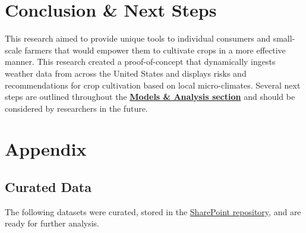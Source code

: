 \documentclass{article}
\begin{document}
\section{Conclusion \& Next Steps}
This research aimed to provide unique tools to individual consumers and small-scale farmers that would empower them to cultivate crops in a more effective manner. This research created a proof-of-concept that dynamically ingests weather data from across the United States and displays risks and recommendations for crop cultivation based on local micro-climates. Several next steps are outlined throughout the \textbf{\hyperref[sec:ma]{Models \& Analysis section}} and should be considered by researchers in the future. 






\appendix
\section{Appendix}
\subsection{Curated Data}
\label{sec:curated}
The following datasets were curated, stored in the \href{https://gtvault.sharepoint.com/:f:/s/MGT-6203Team95/Ev1dI-WU521EnSnFGUY9QigBHe4nMzpq5NIJo9s6VWLIoA?e=qEVO1C}{SharePoint repository}, and are ready for further analysis. 
\end{document}
